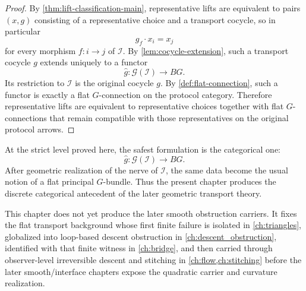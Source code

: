 \begin{proof}
	By \cref{thm:lift-classification-main}, representative lifts are
	equivalent to pairs \((x,g)\) consisting of a representative choice and
	a transport cocycle, so in particular
	\[
		g_f\cdot x_i=x_j
	\]
	for every morphism \(f:i\to j\) of \(\mathcal I\).
	By \cref{lem:cocycle-extension}, such a transport cocycle \(g\)
	extends uniquely to a functor
	\[
		\widehat g:\mathcal G(\mathcal I)\to BG.
	\]
	Its restriction to \(\mathcal I\) is the original cocycle \(g\).
	By \cref{def:flat-connection}, such a functor is exactly a flat
	\(G\)-connection on the protocol category.
	Therefore representative lifts are equivalent to representative
	choices together with flat \(G\)-connections that remain compatible
	with those representatives on the original protocol arrows.
\end{proof}
\begin{remark}
	At the strict level proved here, the safest formulation is the
	categorical one:
	\[
		\widehat g:\mathcal G(\mathcal I)\to BG.
	\]
	After geometric realization of the nerve of \(\mathcal I\), the same
	data become the usual notion of a flat principal \(G\)-bundle.
	Thus the present chapter produces the discrete categorical antecedent
	of the later geometric transport theory.
\end{remark}
\begin{remark}
	This chapter does not yet produce the later smooth obstruction
	carriers. It fixes the flat transport background whose first finite
	failure is isolated in \cref{ch:triangles}, globalized into
	loop-based descent obstruction in \cref{ch:descent_obstruction},
	identified with that finite witness in \cref{ch:bridge}, and then
	carried through observer-level irreversible descent and stitching in
	\cref{ch:flow,ch:stitching} before the later smooth/interface
	chapters expose the quadratic carrier and curvature realization.
\end{remark}
